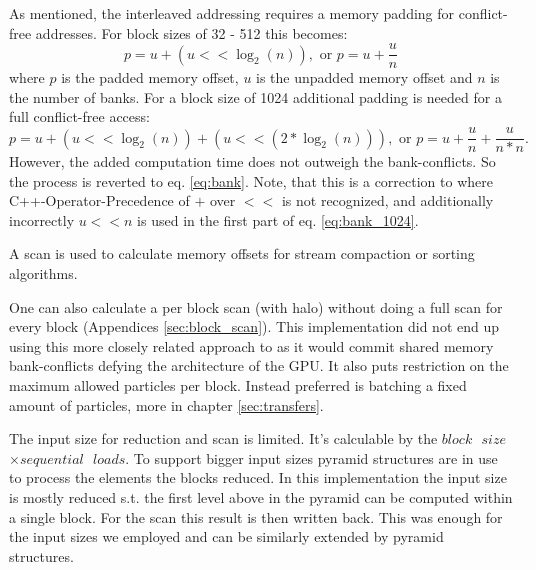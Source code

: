 \documentclass[m,times]{cgMA}
\begin{document}
As mentioned, the interleaved addressing requires a memory padding for conflict-free addresses. For block sizes of 32 - 512 this becomes:
\begin{equation}\label{eq:bank}
  p = u + (u << \log_2(n)), \text{ or }   p = u + \frac{u}{n}
\end{equation}
where $p$ is the padded memory offset, $u$ is the unpadded memory offset and $n$ is the number of banks.
For a block size of 1024 additional padding is needed for a full conflict-free access:
\begin{equation}\label{eq:bank_1024}
  p = u + (u << \log_2(n)) + (u << (2 * \log_2(n))), \text{ or }   p = u + \frac{u}{n} + \frac{u}{n*n}.
\end{equation}
However, the added computation time does not outweigh the bank-conflicts. So the process is reverted to eq. \ref{eq:bank}. Note, that this is a correction to \cite{NVIDIA:SCAN} where C++-Operator-Precedence of $+$ over $<<$ is not recognized, and additionally incorrectly $ u << n$ is used in the first part of eq. \ref{eq:bank_1024}.

A scan is used to calculate memory offsets for stream compaction or sorting algorithms.

One can also calculate a per block scan (with halo) without doing a full scan for every block (Appendices \ref{sec:block_scan}). This implementation did not end up using this more closely related approach to \cite{NVIDIA:NNSEARCH} as it would commit shared memory bank-conflicts defying the architecture of the GPU. It also puts restriction on the maximum allowed particles per block. Instead preferred is batching a fixed amount of particles, more in chapter \ref{sec:transfers}.


The input size for reduction and scan is limited. It's calculable by the $block\text{ }size$ $ \times sequential\text{ }loads$. To support bigger input sizes pyramid structures are in use to process the elements the blocks reduced. In this implementation the input size is mostly reduced s.t. the first level above in the pyramid can be computed within a single block. For the scan this result is then written back. This was enough for the input sizes we employed and can be similarly extended by pyramid structures.
\end{document}

